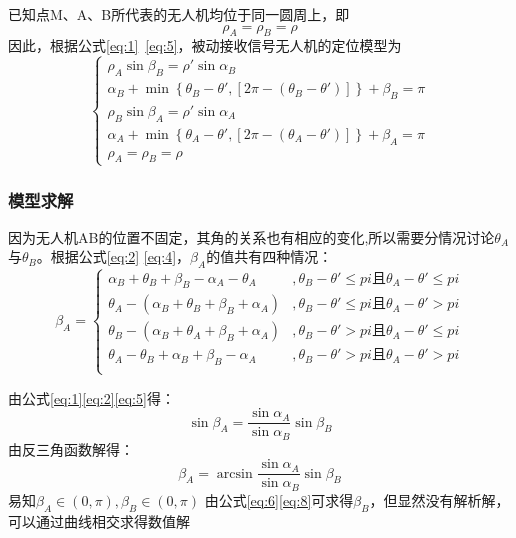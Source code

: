 \documentclass{cumcmthesis}
\begin{document}
已知点M、A、B所代表的无人机均位于同一圆周上，即
\begin{equation}
	\rho_{A} = \rho_{B} =\rho
	\label{eq:5}
\end{equation}
因此，根据公式\cref{eq:1}~\cref{eq:5}，被动接收信号无人机的定位模型为
\begin{equation}
	\begin{cases}
		\rho_{A} \sin\beta_{B} = \rho' \sin\alpha_{B}\\
		\alpha_{B}+ \min \left\{ \theta_{B} - \theta',\left[2\pi - (\theta_{B} - \theta') \right] \right\}    + \beta_{B} = \pi \\
		\rho_{B} \sin\beta_{A} = \rho' \sin\alpha_{A}\\
		\alpha_{A}+ \min \left\{ \theta_{A} - \theta',\left[2\pi - (\theta_{A} - \theta') \right] \right\}    + \beta_{A} = \pi\\
		\rho_{A} = \rho_{B} =\rho\
	\end{cases}
		\label{eq:10}
\end{equation}
\subsubsection{模型求解}
因为无人机AB的位置不固定，其角的关系也有相应的变化,所以需要分情况讨论$\theta_{A}$与$\theta_{B}$。根据公式\cref{eq:2} \cref{eq:4}，$\beta_{A}$的值共有四种情况：
\begin{equation}
	\beta_{A} =
	\begin{cases}
		\alpha_{B}+\theta_{B}+\beta_{B}-\alpha_{A}-\theta_{A} &, \theta_{B}-\theta' \le pi \text{且} \theta_{A}-\theta' \le pi  \\
		\theta_{A}-(\alpha_{B}+\theta_{B}+\beta_{B}+\alpha_{A}) &, \theta_{B}-\theta' \le pi \text{且} \theta_{A}-\theta' > pi  \\
		\theta_{B}-(\alpha_{B}+\theta_{A}+\beta_{B}+\alpha_{A}) &, \theta_{B}-\theta' > pi \text{且} \theta_{A}-\theta' \le pi  \\
		\theta_{A}-\theta_{B}+\alpha_{B}+\beta_{B}-\alpha_{A} &, \theta_{B}-\theta' > pi \text{且} \theta_{A}-\theta' > pi  \\
	\end{cases}
	\label{eq:6}
\end{equation}

由公式\cref{eq:1}\cref{eq:2}\cref{eq:5}得：
\begin{equation}
	\sin \beta_{A} = \frac{\sin \alpha_{A}}{\sin \alpha_{B}} \sin \beta_{B}
	\label{eq:10}
\end{equation}
由反三角函数解得：
\begin{equation}
\beta_{A} = \arcsin \frac{\sin \alpha_{A}}{\sin \alpha_{B}} \sin \beta_{B}
	\label{eq:8}
\end{equation}
易知$\beta_{A} \in (0,\pi),\beta_{B} \in (0,\pi)$
由公式\cref{eq:6}\cref{eq:8}可求得$\beta_{B}$，但显然没有解析解，可以通过曲线相交求得数值解
\end{document}
